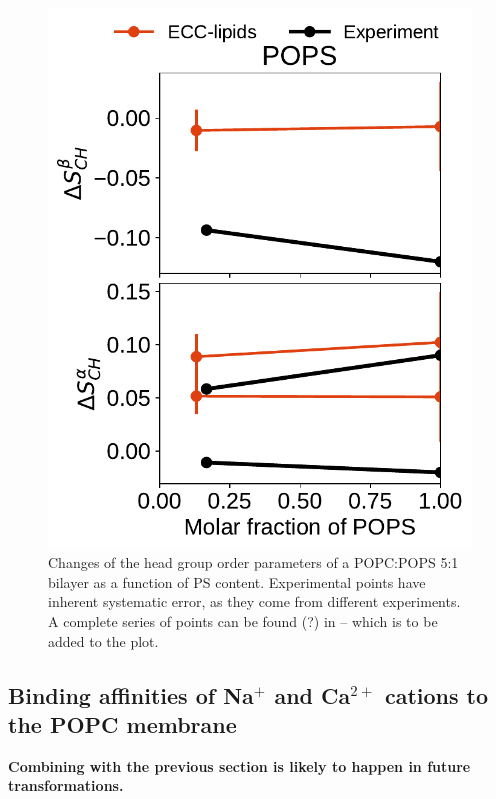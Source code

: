 \begin{figure}[htb!]
  \includegraphics[width=\figwidth]{../img/ecc_pops/order_parameters_changes_A-B_PC-PS_mix_POPS_nacl.pdf} 
  \caption{\label{fig:delta_ordPar_NaCl_PC-PS_mix} 
    Changes of the head group order parameters of a POPC:POPS 5:1 bilayer as a function of PS content.
    Experimental points have inherent systematic error, as they come from different experiments.
    A complete series of points can be found (?) in \cite{roux90} -- which is to be added to the plot.
  } 
\end{figure} 
 
 


\subsection{Binding affinities of Na$^+$ and Ca$^{2+}$ cations to the POPC membrane} 
\label{sec:affinity} 
\textbf{ Combining with the previous section is likely to happen in future transformations. }
 
